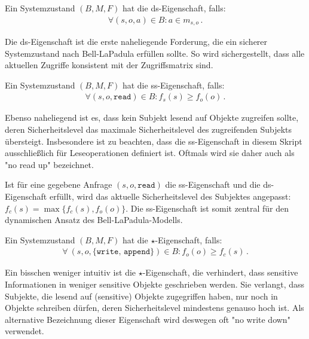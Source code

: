\begin{definition}\indexBLPDiscretionarySecurity
	Ein Systemzustand \((B, M, F)\) hat die ds-Eigenschaft, falls:
	\begin{align*} 
		\forall (s, o, a) \in B : a \in m_{s,o}\, .
	\end{align*}
\end{definition}

Die ds-Eigenschaft ist die erste naheliegende Forderung, die ein sicherer Systemzustand nach Bell-LaPadula erfüllen sollte. So wird sichergestellt, dass alle aktuellen Zugriffe konsistent mit der Zugriffsmatrix sind. 

\begin{definition}\indexBLPSimpleSecurity
	Ein Systemzustand \((B, M, F)\) hat die ss-Eigenschaft, falls:
	\begin{align*} 
		\forall (s, o, \texttt{read}) \in B : f_s(s) \geq f_o(o)\, .
	\end{align*}
\end{definition}

Ebenso naheliegend ist es, dass kein Subjekt lesend auf Objekte zugreifen sollte, deren Sicherheitslevel das maximale
Sicherheitslevel des zugreifenden Subjekts übersteigt. Insbesondere ist zu beachten, dass die ss-Eigenschaft in diesem
Skript ausschließlich für Leseoperationen definiert ist. Oftmals wird sie daher auch als "{}no read up"{} bezeichnet.

Ist für eine gegebene Anfrage \((s, o, \texttt{read})\) die ss-Eigenschaft und die ds-Eigenschaft erfüllt, wird das aktuelle Sicherheitslevel des Subjektes angepasst:
\(f_c(s) = \max \{f_c(s), f_o(o)\}\). Die ss-Eigenschaft ist somit zentral für den dynamischen Ansatz des Bell-LaPadula-Modells.

\begin{definition}\indexBLPStarProperty
	Ein Systemzustand \((B, M, F)\) hat die \(\star\)-Eigenschaft, falls: 
	\begin{align*}
		\forall\ (s, o, \texttt{\{write, append\}}) \in B : f_o(o) \geq f_c(s)\, .
	\end{align*}
\end{definition}

Ein bisschen weniger intuitiv ist die \(\star\)-Eigenschaft, die verhindert, dass sensitive Informationen in weniger sensitive Objekte geschrieben werden. Sie verlangt, dass Subjekte, die lesend auf (sensitive) Objekte zugegriffen haben, nur noch in Objekte schreiben dürfen, deren Sicherheitslevel mindestens genauso hoch ist. Als alternative Bezeichnung dieser Eigenschaft wird deswegen oft "{}no write down"{} verwendet.

